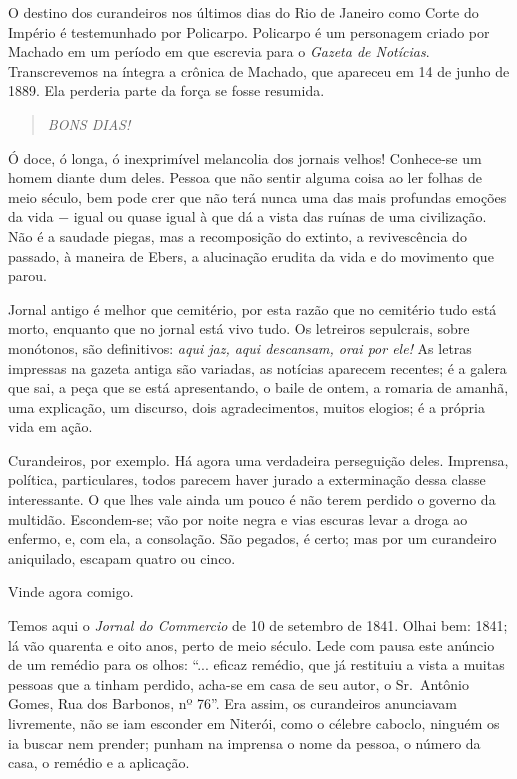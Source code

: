 O destino dos curandeiros nos últimos dias do Rio de Janeiro como Corte
do Império é testemunhado por Policarpo. Policarpo é um personagem
criado por Machado em um período em que escrevia para o \emph{Gazeta de
Notícias}. Transcrevemos na íntegra a crônica de Machado, que apareceu
em 14 de junho de 1889. Ela perderia parte da força se fosse resumida.

\begin{quote}
\emph{BONS DIAS!}
\end{quote}

Ó doce, ó longa, ó inexprimível melancolia dos jornais velhos!
Conhece-se um homem diante dum deles. Pessoa que não sentir alguma coisa
ao ler folhas de meio século, bem pode crer que não terá nunca uma das
mais profundas emoções da vida − igual ou quase igual à que dá a vista
das ruínas de uma civilização. Não é a saudade piegas, mas a
recomposição do extinto, a revivescência do passado, à maneira de Ebers,
a alucinação erudita da vida e do movimento que parou.

Jornal antigo é melhor que cemitério, por esta razão que no cemitério
tudo está morto, enquanto que no jornal está vivo tudo. Os letreiros
sepulcrais, sobre monótonos, são definitivos: \emph{aqui jaz, aqui
descansam, orai por ele!} As letras impressas na gazeta antiga são
variadas, as notícias aparecem recentes; é a galera que sai, a peça que
se está apresentando, o baile de ontem, a romaria de amanhã, uma
explicação, um discurso, dois agradecimentos, muitos elogios; é a
própria vida em ação.

Curandeiros, por exemplo. Há agora uma verdadeira perseguição deles.
Imprensa, política, particulares, todos parecem haver jurado a
exterminação dessa classe interessante. O que lhes vale ainda um pouco é
não terem perdido o governo da multidão. Escondem-se; vão por noite
negra e vias escuras levar a droga ao enfermo, e, com ela, a consolação.
São pegados, é certo; mas por um curandeiro aniquilado, escapam quatro
ou cinco.

Vinde agora comigo.

Temos aqui o \emph{Jornal do Commercio} de 10 de setembro de 1841. Olhai
bem: 1841; lá vão quarenta e oito anos, perto de meio século. Lede com
pausa este anúncio de um remédio para os olhos: ``... eficaz remédio,
que já restituiu a vista a muitas pessoas que a tinham perdido, acha-se
em casa de seu autor, o Sr.~Antônio Gomes, Rua dos Barbonos, nº 76''.
Era assim, os curandeiros anunciavam livremente, não se iam esconder em
Niterói, como o célebre caboclo, ninguém os ia buscar nem prender;
punham na imprensa o nome da pessoa, o número da casa, o remédio e a
aplicação.

